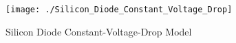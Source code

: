 \begin{figure}[h!tbp]
  \centering
  \texttt{[image: ./Silicon\_Diode\_Constant\_Voltage\_Drop]}
  \caption{Silicon Diode Constant-Voltage-Drop Model \parencite[p.~193]{sedraTextbook7}}
  \label{fig:Silicon_Diode_Constant_Voltage_Drop}
\end{figure}


